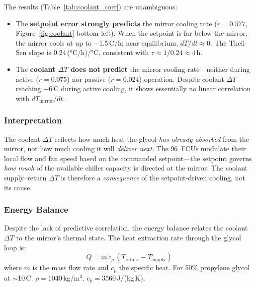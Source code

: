 \documentclass[11pt]{article}
\begin{document}
The results (Table~\ref{tab:coolant_corr}) are unambiguous:
\begin{itemize}
  \item The \textbf{setpoint error strongly predicts} the mirror cooling
    rate ($r = 0.577$, Figure~\ref{fig:coolant} bottom left).  When
    the setpoint is far below the mirror, the mirror cools at up to
    $-1.5$\,\textdegree C/h; near equilibrium, $dT/dt \approx 0$.
    The Theil-Sen slope is 0.24\,(°C/h)/°C, consistent with
    $\tau \approx 1/0.24 \approx 4$\,h.
  \item The \textbf{coolant $\Delta T$ does not predict} the mirror cooling
    rate---neither during active ($r = 0.075$) nor passive
    ($r = 0.024$) operation.  Despite coolant $\Delta T$ reaching
    $-6$\,\textdegree C during active cooling, it shows essentially
    no linear correlation with $dT_\mathrm{mirror}/dt$.
\end{itemize}

\subsubsection{Interpretation}

The coolant $\Delta T$ reflects how much heat the glycol \emph{has
already absorbed} from the mirror, not how much cooling it will
\emph{deliver next}.  The 96~FCUs modulate their local flow and fan
speed based on the commanded setpoint---the setpoint governs
\emph{how much} of the available chiller capacity is directed at
the mirror.  The coolant supply--return $\Delta T$ is therefore a
\emph{consequence} of the setpoint-driven cooling, not its cause.

\subsubsection{Energy Balance}

Despite the lack of predictive correlation, the energy balance
relates the coolant $\Delta T$ to the mirror's thermal state.
The heat extraction rate through the glycol loop is:
\begin{equation}
  \dot{Q} = \dot{m}\, c_p\, (T_\mathrm{return} - T_\mathrm{supply})
  \label{eq:qdot}
\end{equation}
where $\dot{m}$ is the mass flow rate and $c_p$ the specific heat.
For 50\% propylene glycol at $\sim$10\,\textdegree C:
$\rho = 1040$\,kg/m$^3$, $c_p = 3560$\,J/(kg\,K).
\end{document}
